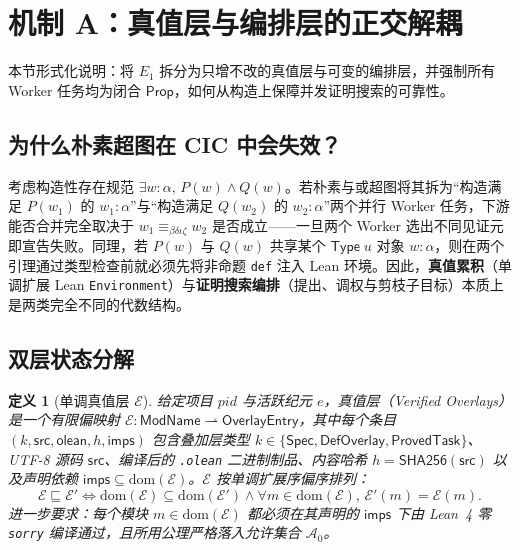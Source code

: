 \documentclass[10pt,a4paper,fontset=fandol]{ctexart}
\newtheorem{definition}[theorem]{定义}
\newcommand{\Truth}{\mathcal{E}}
\newcommand{\Prop}{\mathsf{Prop}}
\newcommand{\TypeU}{\mathsf{Type}\;u}
\newcommand{\DefEq}{\equiv_{\beta\delta\iota\zeta}}
\newcommand{\AxiomsZero}{\mathcal{A}_0}
\newcommand{\kw}[1]{\mathsf{#1}}
\newcommand{\code}[1]{\texttt{#1}}
\begin{document}
\section{机制 A：真值层与编排层的正交解耦}\label{sec:mech-a}

本节形式化说明：将 $E_1$ 拆分为只增不改的真值层与可变的编排层，并强制所有 Worker 任务均为闭合 $\Prop$，如何从构造上保障并发证明搜索的可靠性。

\subsection{为什么朴素超图在 CIC 中会失效？}
考虑构造性存在规范 $\exists w : \alpha,\, P(w) \land Q(w)$。若朴素与或超图将其拆为“构造满足 $P(w_1)$ 的 $w_1 : \alpha$”与“构造满足 $Q(w_2)$ 的 $w_2 : \alpha$”两个并行 Worker 任务，下游能否合并完全取决于 $w_1 \DefEq w_2$ 是否成立——一旦两个 Worker 选出不同见证元即宣告失败。同理，若 $P(w)$ 与 $Q(w)$ 共享某个 $\TypeU$ 对象 $w : \alpha$，则在两个引理通过类型检查前就必须先将非命题 \code{def} 注入 Lean 环境。因此，\textbf{真值累积}（单调扩展 Lean \code{Environment}）与\textbf{证明搜索编排}（提出、调权与剪枝子目标）本质上是两类完全不同的代数结构。

\subsection{双层状态分解}

\begin{definition}[单调真值层 $\Truth$]\label{def:truth-layer}
给定项目 $pid$ 与活跃纪元 $e$，真值层（\emph{Verified Overlays}）是一个有限偏映射 $\Truth : \kw{ModName} \rightharpoonup \kw{OverlayEntry}$，其中每个条目 $(k, \kw{src}, \kw{olean}, h, \kw{imps})$ 包含叠加层类型 $k \in \{\kw{Spec},\allowbreak \kw{DefOverlay},\allowbreak \kw{ProvedTask}\}$、UTF-8 源码 $\kw{src}$、编译后的 \code{.olean} 二进制制品、内容哈希 $h = \kw{SHA256}(\kw{src})$ 以及声明依赖 $\kw{imps} \subseteq \mathrm{dom}(\Truth)$。$\Truth$ 按单调扩展序偏序排列：
\[
\Truth \sqsubseteq \Truth' \iff \mathrm{dom}(\Truth) \subseteq \mathrm{dom}(\Truth') \land \forall m \in \mathrm{dom}(\Truth),\, \Truth'(m) = \Truth(m).
\]
进一步要求：每个模块 $m \in \mathrm{dom}(\Truth)$ 都必须在其声明的 $\kw{imps}$ 下由 Lean~4 零 \code{sorry} 编译通过，且所用公理严格落入允许集合 $\AxiomsZero$。
\end{definition}
\end{document}
